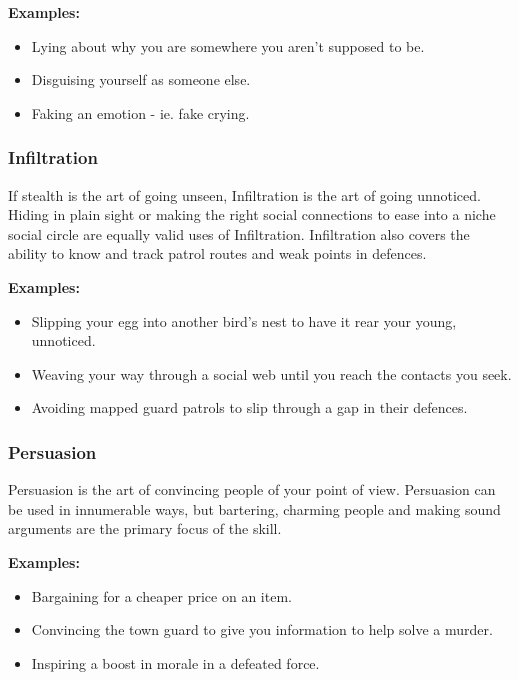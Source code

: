 \begin{displayquote}
    \textbf{Examples:}
    \begin{itemize}
        \item Lying about why you are somewhere you aren't supposed to be.
        \item Disguising yourself as someone else.
        \item Faking an emotion - ie. fake crying.
    \end{itemize}
\end{displayquote}

\subsubsection{Infiltration} \label{subsubsec:infiltration}

If stealth is the art of going unseen, Infiltration is the art of going unnoticed. Hiding in plain sight or making the right social connections to ease into a niche social circle are equally valid uses of Infiltration. Infiltration also covers the ability to know and track patrol routes and weak points in defences.

\begin{displayquote}
    \textbf{Examples:}
    \begin{itemize}
        \item Slipping your egg into another bird's nest to have it rear your young, unnoticed.
        \item Weaving your way through a social web until you reach the contacts you seek.
        \item Avoiding mapped guard patrols to slip through a gap in their defences.
    \end{itemize}
\end{displayquote}

\subsubsection{Persuasion} \label{subsubsec:persuasion}

Persuasion is the art of convincing people of your point of view. Persuasion can be used in innumerable ways, but bartering, charming people and making sound arguments are the primary focus of the skill.

\begin{displayquote}
    \textbf{Examples:}
    \begin{itemize}
        \item Bargaining for a cheaper price on an item.
        \item Convincing the town guard to give you information to help solve a murder.
        \item Inspiring a boost in morale in a defeated force.
    \end{itemize}
\end{displayquote}

